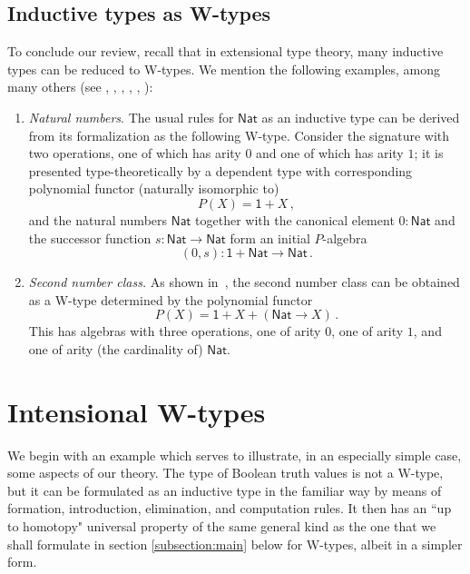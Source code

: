 \documentclass{article}
\newcommand{\nat}{\ensuremath{\mathsf{Nat}}}
\newcommand{\List}{\mathsf{List}}
\theoremstyle{remark}
\theoremstyle{definition}
\begin{document}
\subsection{Inductive types as W-types}

\noindent To conclude our review, recall that in extensional type theory, many inductive types can be reduced to W-types.  We mention the following  examples, among many others (see \cite{MartinLofP:inttt}, \cite{DybjerP:repids}, \cite{GoguenH:inddtw}, \cite{MoerdijkI:weltc}, \cite{GambinoN:weltdp}, \cite{AbbottM:concsp}):
\begin{enumerate}
\item \emph{Natural numbers}. \label{extnatW}
The usual rules for $\nat$ as an inductive type can be derived from its formalization as the following W-type. Consider the signature with two operations, one of which has arity $0$ and one of which has arity $1$; it is presented type-theoretically by a dependent type with corresponding polynomial functor (naturally isomorphic to)
\[
P(X) = \mathsf{1} + X \, ,
\]
%
and the natural numbers $\nat$ together with the canonical element $0:\nat$ and the successor function $s : \nat\rightarrow\nat$ form an initial $P$-algebra
\[
(0, s) : \mathsf{1} + \nat \rightarrow \nat\, .
\]
%
\item \emph{Second number class.}
As shown in~\cite{MartinLofP:inttt}, the second number class can be obtained as a W-type determined by the polynomial functor 
\[
P(X) = \mathsf{1} + X + (\nat \rightarrow X) \, .
\]
This has algebras with three operations, one of arity $0$, one of arity $1$, and one of arity (the cardinality of) $\nat$.
%
\end{enumerate}

\smallskip

\section{Intensional W-types}\label{section:intW}

\noindent We begin with an example which serves to illustrate, in an especially simple case, some aspects of our theory.  The type of Boolean truth values is not a W-type, but it can be formulated as an inductive type in the familiar way by means of  formation, introduction, elimination, and computation rules.  It then has an ``up to homotopy" universal property of the same general kind as the one that we shall formulate in section \ref{subsection:main} below for W-types, albeit in a simpler form.
\end{document}
